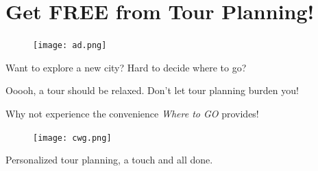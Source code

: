 \documentclass{mcmthesis}
\begin{document}



\newpage
\section*{Get FREE from Tour Planning!}
  \begin{figure}[ht]
    \centering
    \texttt{[image: ad.png]}
  \end{figure}
Want to explore a new city? Hard to decide where to go? \par
Ooooh, a tour should be relaxed. Don't let tour planning burden you! \par
  \centering
Why not experience the convenience \emph{Where to GO} provides!\par
  \begin{figure}[ht]
    \centering
    \texttt{[image: cwg.png]}
  \end{figure}
\begin{large}
  Personalized tour planning, a touch and all done.
\end{large}

	

	
\newpage

\begin{appendices}

\end{appendices}
\end{document}
